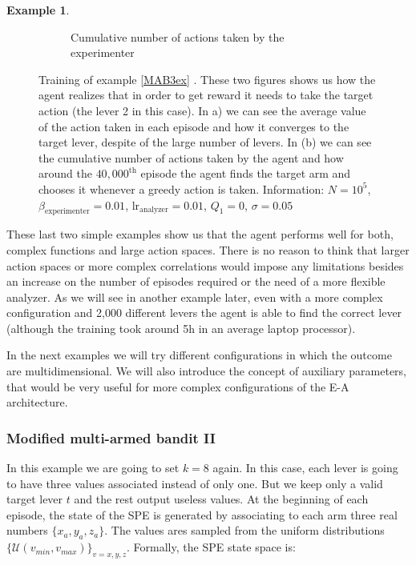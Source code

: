 \documentclass[11pt,a4paper,twoside]{report}
\newcommand{\+}{\textnormal{+} }
\theoremstyle{definition}
\newtheorem{myex}[mythm]{Example}
\numberwithin{equation}{chapter}
\begin{document}
\begin{myex}
\begin{figure}[]
\begin{subfigure}{.5\textwidth}
        \caption{Cumulative number of actions taken by the experimenter}
        \label{fig:actionsMAB3}
      \end{subfigure}
      \caption{Training of example \ref{MAB3ex} . These two figures shows us how
      the agent realizes that in order to get reward it needs to take the target
      action (the lever 2 in this case). In a) we can see the average value of
      the action taken in each episode and how it converges to the target lever,
      despite of the large number of levers. In (b) we can see the cumulative
      number of actions taken by the agent and how around the $40,000^\text{th}$
      episode the agent finds the target arm and chooses it whenever a greedy
      action is taken. Information: $N=10^5$, $\beta_\text{experimenter}=0.01$,
      $\text{lr}_\text{analyzer}=0.01$, $Q_1=0$, $\sigma=0.05$}
    \end{figure}
  \end{myex}

  These last two simple examples show us that the agent performs well for both,
  complex functions and large action spaces. There is no reason to think that
  larger action spaces or more complex correlations would impose any limitations
  besides an increase on the number of episodes required or the need of a more
  flexible analyzer. As we will see in another example later, even with a more
  complex configuration and 2,000 different levers the agent is able to find the
  correct lever (although the training took around 5h in an average laptop
  processor).

  \par In the next examples we will try different configurations in which the
  outcome are multidimensional. We will also introduce the concept of auxiliary
  parameters, that would be very useful for more complex configurations of the
  E-A architecture.

  \subsubsection{Modified multi-armed bandit II}
    In this example we are going to set $k=8$ again. In this case, each
    lever is going to have three values associated instead of only one. But 
    we keep only a valid target lever $t$ and the rest output useless
    values. At the beginning of each episode, the
    state of the SPE is generated by associating to each arm three real numbers
     $\{x_a,y_a,z_a\}$. The values ares sampled from the uniform distributions
    $\{\mathcal{U}(v_{min},v_{max})\}_{v=x,y,z}$. Formally, the SPE state space 
    is:
    
\end{document}
